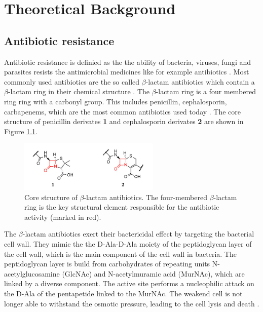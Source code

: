 \chapter{Theoretical Background}

\section{Antibiotic resistance}

Antibiotic resistance is definied as the the ability of bacteria, viruses, fungi and parasites resists the antimicrobial medicines like for example antibiotics \cite{who_antibiotic_resistance}. Most commonly used antibiotics are the so called $\beta$-lactam antibiotics which contain a $\beta$-lactam ring in their chemical structure \cite{bush2013}. The $\beta$-lactam ring is a four membered ring ring with a carbonyl group. This includes penicillin, cephalosporin, carbapenems, which are the most common antibiotics used today \cite{versporten2018}. The core structure of penicillin derivates \textbf{1} and cephalosporin derivates \textbf{2} are shown in Figure \ref{fig:beta_lactam_antibiotics}.

\begin{figure}[htbp]
    \centering
    \includegraphics[width=0.6\textwidth]{resources/images/beta_lactam_antibiotics_example.jpeg}
    \caption{Core structure of $\beta$-lactam antibiotics. The four-membered $\beta$-lactam ring is the key structural element responsible for the antibiotic activity (marked in red).}
    \label{fig:beta_lactam_antibiotics}
\end{figure}

The $\beta$-lactam antibiotics exert their bactericidal effect by targeting the bacterial cell wall. They mimic the the D-Ala-D-Ala moiety of the peptidoglycan layer of the cell wall, which is the main component of the cell wall in bacteria. The peptidoglycan layer is build from carbohydrates of repeating units N-acetylglucosamine (GlcNAc) and N-acetylmuramic acid (MurNAc), which are linked by a diverse component. The active site performs a nucleophilic attack on the D-Ala of the pentapetide linked to the MurNAc. The weakend cell is not longer able to withstand the osmotic pressure, leading to the cell lysis and death \cite{kim2023}.

